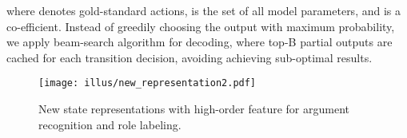 \documentclass[letterpaper]{article} \usepackage{aaai21}  \usepackage{times}  \usepackage{helvet} \usepackage{courier}  \usepackage[hyphens]{url}  \usepackage{graphicx} \urlstyle{rm} \def\UrlFont{\rm}  \usepackage{natbib}  \usepackage{caption}
\begin{document}
\begin{CJK}{UTF8}{gbsn}
where  denotes gold-standard actions,
 is the set of all model parameters,
and  is a co-efficient.
Instead of greedily choosing the output with maximum probability, we apply beam-search algorithm \cite{zhang-clark-2008-tale,LyuZJ16} for decoding, where top-B partial outputs are cached for each transition decision, avoiding achieving sub-optimal results.









\begin{figure}[!t]
\centering
\texttt{[image: illus/new\_representation2.pdf]}
\caption{
New state representations with high-order feature for argument recognition and role labeling.
}
\label{new-state}
\end{figure}






\begin{table*}[!t]
\begin{center}
\end{center}
  \caption{
  Results on CoNLL09 English in-domain test set.
  Decode means decoding speed (token per second).
  }
  \label{English-in-domain}
\end{table*}







\end{CJK}
\end{document}
